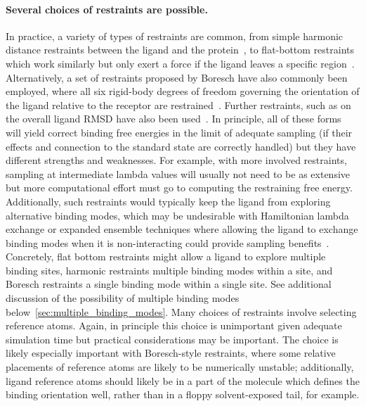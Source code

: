 \documentclass[9pt,bestpractices]{livecoms}
\begin{document}
\paragraph{Several choices of restraints are possible.}
In practice, a variety of types of restraints are common, from simple harmonic distance restraints between the ligand and the protein~\cite{mobley2006use}, to flat-bottom restraints which work similarly but only exert a force if the ligand leaves a specific region~\cite{}.
%
Alternatively, a set of restraints proposed by Boresch have also commonly been employed, where all six rigid-body degrees of freedom governing the orientation of the ligand relative to the receptor are restrained~\cite{leitgeb2005alchemical}.
Further restraints, such as on the overall ligand RMSD have also been used~\cite{woo2005calculation}.
%
In principle, all of these forms will yield correct binding free energies in the limit of adequate sampling (if their effects and connection to the standard state are correctly handled) but they have different strengths and weaknesses.
For example, with more involved restraints, sampling at intermediate lambda values will usually not need to be as extensive but more computational effort must go to computing the restraining free energy.
Additionally, such restraints would typically keep the ligand from exploring alternative binding modes, which may be undesirable with Hamiltonian lambda exchange or expanded ensemble techniques where allowing the ligand to exchange binding modes when it is non-interacting could provide sampling benefits~\cite{wang2013identifying}.
Concretely, flat bottom restraints might allow a ligand to explore multiple binding sites, harmonic restraints multiple binding modes within a site, and Boresch restraints a single binding mode within a single site.
See additional discussion of the possibility of multiple binding modes below~\ref{sec:multiple_binding_modes}.
%
Many choices of restraints involve selecting reference atoms.
Again, in principle this choice is unimportant given adequate simulation time but practical considerations may be important.
The choice is likely especially important with Boresch-style restraints, where some relative placements of reference atoms are likely to be numerically unstable; additionally, ligand reference atoms should likely be in a part of the molecule which defines the binding orientation well, rather than in a floppy solvent-exposed tail, for example.
%
\end{document}
